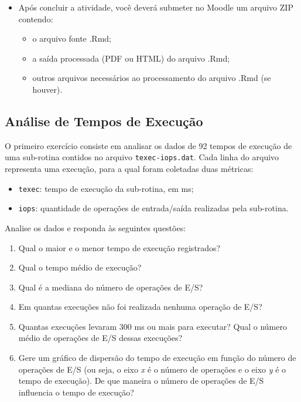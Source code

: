 \documentclass[
]{article}
\providecommand{\tightlist}{%
  \setlength{\itemsep}{0pt}\setlength{\parskip}{0pt}}
\begin{document}
\begin{itemize}
\tightlist
\item
  Após concluir a atividade, você deverá submeter no Moodle um arquivo
  ZIP contendo:

  \begin{itemize}
  \tightlist
  \item
    o arquivo fonte .Rmd;
  \item
    a saída processada (PDF ou HTML) do arquivo .Rmd;
  \item
    outros arquivos necessários ao processamento do arquivo .Rmd (se
    houver).
  \end{itemize}
\end{itemize}

\hypertarget{anuxe1lise-de-tempos-de-execuuxe7uxe3o}{%
\subsection{Análise de Tempos de
Execução}\label{anuxe1lise-de-tempos-de-execuuxe7uxe3o}}

O primeiro exercício consiste em analisar os dados de 92 tempos de
execução de uma sub-rotina contidos no arquivo \texttt{texec-iops.dat}.
Cada linha do arquivo representa uma execução, para a qual foram
coletadas duas métricas:

\begin{itemize}
\tightlist
\item
  \texttt{texec}: tempo de execução da sub-rotina, em ms;
\item
  \texttt{iops}: quantidade de operações de entrada/saída realizadas
  pela sub-rotina.
\end{itemize}

Analise os dados e responda às seguintes questões:

\begin{enumerate}
\def\labelenumi{\arabic{enumi}.}
\tightlist
\item
  Qual o maior e o menor tempo de execução registrados?
\item
  Qual o tempo médio de execução?
\item
  Qual é a mediana do número de operações de E/S?
\item
  Em quantas execuções não foi realizada nenhuma operação de E/S?
\item
  Quantas execuções levaram 300 ms ou mais para executar? Qual o número
  médio de operações de E/S dessas execuções?
\item
  Gere um gráfico de dispersão do tempo de execução em função do número
  de operações de E/S (ou seja, o eixo \emph{x} é o número de operações
  e o eixo \emph{y} é o tempo de execução). De que maneira o número de
  operações de E/S influencia o tempo de execução?
\end{enumerate}
\end{document}
